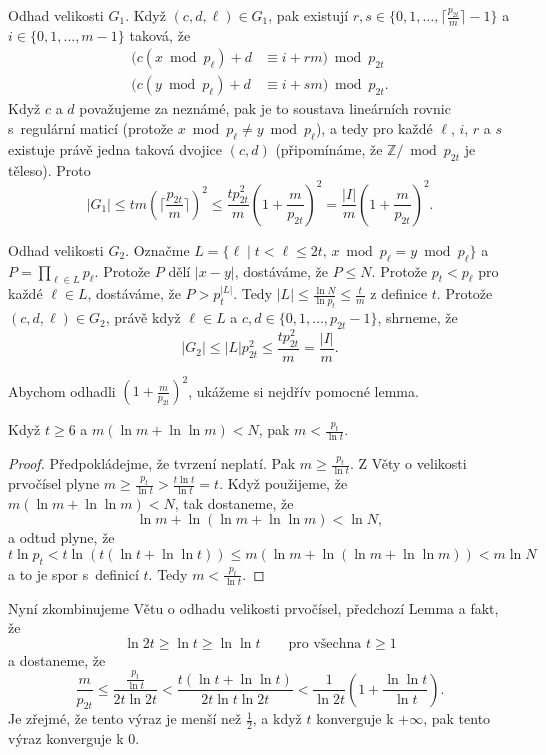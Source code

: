 \documentclass[a4paper,12pt]{article}
\begin{document}
Odhad velikosti $G_1$. Když $(c,d,\ell )\in G_1$, pak 
existují $r,s\in \{0,1,\dots,\lceil\frac {p_{2t}}m\rceil -1\}$ a $
i\in \{0,1,\dots,m-1\}$ 
taková, že 
\begin{align*}(c(x\bmod p_{\ell})+d&\equiv i+rm)\bmod p_{2t}\\
(c(y\bmod p_{\ell})+d&\equiv i+sm)\bmod p_{2t}.\end{align*}
Když $c$ a $d$ považujeme za neznámé, pak je to  
soustava lineár\-ních rovnic s~regulární maticí (protože 
$x\bmod p_{\ell}\ne y\bmod p_{\ell}$), a tedy pro každé $\ell$, $
i$, $r$ a $s$ 
existuje právě jedna taková dvojice $(c,d)$ (připomínáme, že $\mathbb Z/\bmod p_{2t}$ je těleso). Proto 
$$|G_1|\le tm(\lceil\frac {p_{2t}}m\rceil )^2\le\frac {tp_{2t}^2}
m(1+\frac m{p_{2t}})^2=\frac {|I|}m(1+\frac m{p_{2t}})^2.$$

Odhad velikosti $G_2$. Označme 
$L=\{\ell\mid t<\ell\le 2t,\,x\bmod p_{\ell}=y\bmod p_{\ell}\}$ a $
P=\prod_{\ell\in L}p_{\ell}$. 
Protože $P$ dělí $|x-y|$, dostáváme, že $P\le N$. Protože 
$p_t<p_{\ell}$ pro každé $\ell\in L$, dostáváme, že $
P>p_t^{|L|}$. Tedy 
$|L|\le\frac {\ln N}{\ln p_t}\le\frac tm$ z definice $t$. Protože $
(c,d,\ell )\in G_2$, právě 
když $\ell\in L$ a $c,d\in \{0,1,\dots,p_{2t}-1\}$, shrneme, že 
$$|G_2|\le |L|p_{2t}^2\le\frac {tp_{2t}^2}m=\frac {|I|}m.$$

Abychom odhadli $(1+\frac m{p_{2t}})^2$, ukážeme si nejdřív 
pomocné lem\-ma.

\begin{lemma}Když $t\ge 6$ a $m(\ln m+\ln\ln m)<N$, pak $m<\frac {
p_t}{\ln t}$.
\end{lemma}

\begin{proof}Předpokládejme, že tvrzení neplatí. Pak $
m\ge\frac {p_t}{\ln t}$. Z Věty o velikosti 
prvo\-čí\-sel plyne $m\ge\frac {p_t}{\ln t}>\frac {t\ln 
t}{\ln t}=t$. Když použijeme, že 
$m(\ln m+\ln\ln m)<N$, tak dostaneme, že 
$$\ln m+\ln(\ln m+\ln\ln m)<\ln N,$$
a odtud plyne, že 
$$t\ln p_t<t\ln(t(\ln t+\ln\ln t))\le m(\ln m+\ln(\ln m+\ln\ln m)
)<m\ln N$$
a to je spor s~definicí $t$. Tedy $m<\frac {p_t}{\ln t}$.
\end{proof}

Nyní zkombinujeme Větu o odhadu velikosti prvočísel, 
před\-cho\-zí Lemma a fakt, že 
$$\ln2t\ge\ln t\ge\ln\ln t\qquad\text{pro všechna }t\ge 1$$
a dostaneme, že
$$\frac m{p_{2t}}\le\frac {\frac {p_t}{\ln t}}{2t\ln2t}<\frac {t(\ln 
t+\ln\ln t)}{2t\ln t\ln2t}<\frac 1{\ln2t}(1+\frac {\ln\ln t}{\ln 
t}).$$
Je zřejmé, že tento výraz je menší než $\frac 
12$, 
a když $t$ konverguje k $+\infty$, pak tento výraz konverguje k $
0$.
\end{document}
